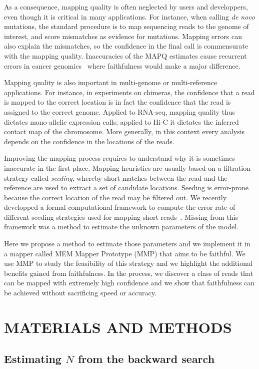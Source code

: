 \documentclass[a4,center,fleqn]{NAR}
\begin{document}
As a consequence, mapping quality is often neglected by users and
developpers, even though it is critical in many applications. For
instance, when calling \textit{de novo} mutations, the standard procedure
is to map sequencing reads to the genome of interest, and score mismatches
as evidence for mutations. Mapping errors can also explain the mismatches,
so the confidence in the final call is commensurate with the mapping
quality. Inaccuracies of the MAPQ estimates cause recurrent errors in
cancer genomics~\cite{dunno} where faithfulness would make a major
difference.

Mapping quality is also important in multi-genome or multi-reference
applications. For instance, in experiments on chimeras, the confidence
that a read is mapped to the correct location is in fact the confidence
that the read is assigned to the correct genome. Applied to RNA-seq,
mapping quality thus dictates mono-allelic expression calls; applied to
Hi-C it dictates the inferred contact map of the chromosome. More
generally, in this context every analysis depends on the confidence in
the locations of the reads.

Improving the mapping process requires to understand why it is sometimes
inaccurate in the first place. Mapping heuristics are usually based on a
filtration strategy called \emph{seeding}, whereby short matches between
the read and the reference are used to extract a set of candidate
locations. Seeding is error-prone because the correct location of the read
may be filtered out. We recently developped a formal computational
framework to compute the error rate of different seeding strategies used
for mapping short reads~\cite{Filion619155}. Missing from this framework
was a method to estimate the unknown parameters of the model.

Here we propose a method to estimate those parameters and we implement it
in a mapper called MEM Mapper Prototype (MMP) that aims to be faithful. We
use MMP to study the feasibility of this strategy and we highlight the
additional benefits gained from faithfulness. In the process, we discover
a class of reads that can be mapped with extremely high confidence and we
show that faithfulness can be achieved without sacrificing speed or
accuracy.


\section{MATERIALS AND METHODS}

\subsection{Estimating $N$ from the backward search}
\end{document}
